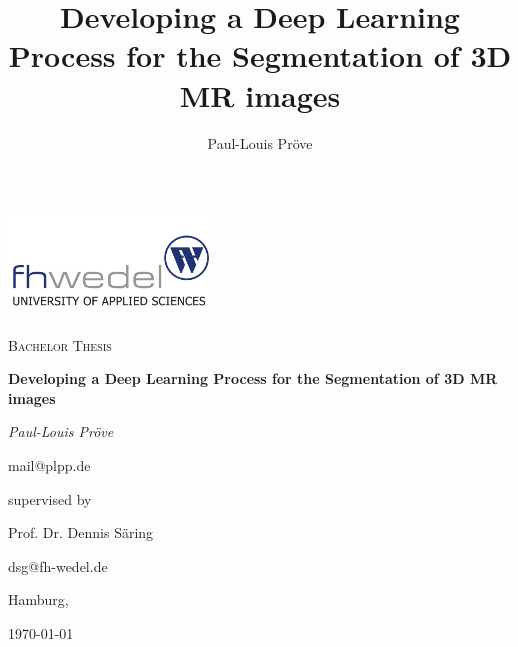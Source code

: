 \documentclass[11pt, a4paper]{article}
\title{Developing a Deep Learning Process for the Segmentation of 3D MR images}
\author{Paul-Louis Pröve}
\begin{document}
    \begin{titlepage}
    \centering
    \includegraphics[width=0.4\textwidth]{fhw.png}\par
    \vspace{1cm}
    {\scshape\Large Bachelor Thesis\par}
    \vspace{2cm}
    {\bfseries\Huge Developing a Deep Learning Process for the Segmentation of 3D MR images\par}
    \vspace{2cm}
    {\itshape\Large Paul-Louis Pröve\par}
    mail@plpp.de\par
    \vfill
    supervised by\par
    Prof. Dr. Dennis Säring\par
    dsg@fh-wedel.de\par
    \vspace{1cm}
    Hamburg,\par \today\par
    \end{titlepage}

\tableofcontents
\newpage












\end{document}

